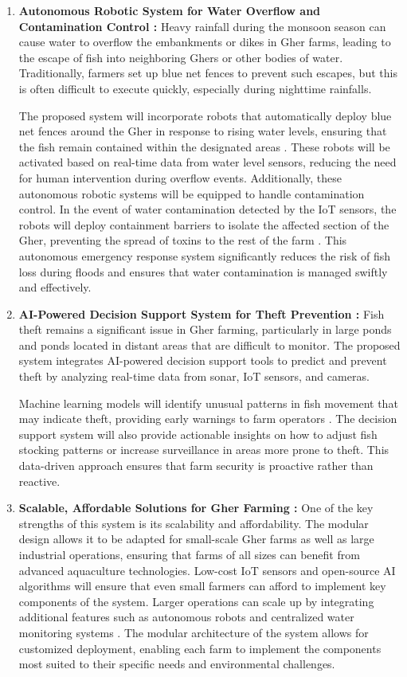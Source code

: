 \documentclass[conference]{IEEEtran}
\begin{document}
\begin{enumerate}
	\item \textbf{Autonomous Robotic System for Water Overflow and Contamination Control : }
	Heavy rainfall during the monsoon season can cause water to overflow the embankments or dikes in Gher farms, leading to the escape of fish into neighboring Ghers or other bodies of water. Traditionally, farmers set up blue net fences to prevent such escapes, but this is often difficult to execute quickly, especially during nighttime rainfalls.
	
The proposed system will incorporate robots that automatically deploy blue net fences around the Gher in response to rising water levels, ensuring that the fish remain contained within the designated areas \cite{ref21}. These robots will be activated based on real-time data from water level sensors, reducing the need for human intervention during overflow events. Additionally, these autonomous robotic systems will be equipped to handle contamination control. In the event of water contamination detected by the IoT sensors, the robots will deploy containment barriers to isolate the affected section of the Gher, preventing the spread of toxins to the rest of the farm \cite{ref19}. This autonomous emergency response system significantly reduces the risk of fish loss during floods and ensures that water contamination is managed swiftly and effectively.
	
	
	\item \textbf{ AI-Powered Decision Support System for Theft Prevention : }
Fish theft remains a significant issue in Gher farming, particularly in large ponds and ponds located in distant areas that are difficult to monitor. The proposed system integrates AI-powered decision support tools to predict and prevent theft by analyzing real-time data from sonar, IoT sensors, and cameras.

Machine learning models will identify unusual patterns in fish movement that may indicate theft, providing early warnings to farm operators \cite{ref22}. The decision support system will also provide actionable insights on how to adjust fish stocking patterns or increase surveillance in areas more prone to theft. This data-driven approach ensures that farm security is proactive rather than reactive.
	
	
	\item \textbf{ Scalable, Affordable Solutions for Gher Farming : }
One of the key strengths of this system is its scalability and affordability. The modular design allows it to be adapted for small-scale Gher farms as well as large industrial operations, ensuring that farms of all sizes can benefit from advanced aquaculture technologies. Low-cost IoT sensors and open-source AI algorithms will ensure that even small farmers can afford to implement key components of the system. Larger operations can scale up by integrating additional features such as autonomous robots and centralized water monitoring systems \cite{ref18}. The modular architecture of the system allows for customized deployment, enabling each farm to implement the components most suited to their specific needs and environmental challenges.
	

\end{enumerate}
\end{document}
